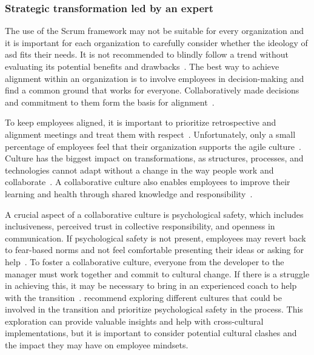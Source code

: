 
\subsubsection*{Strategic transformation led by an expert}\label{subsubsec:StrategicTransformation}
The use of the Scrum \gls{framework} may not be suitable for every organization and it is important for each organization to carefully consider whether the \gls{ideology} of \ac{asd} fits their needs. It is not recommended to blindly follow a trend without evaluating its potential benefits and drawbacks~\cite[p.~152]{Meyer2014ABM}. The best way to achieve alignment within an organization is to involve employees in decision-making and find a common ground that works for everyone. Collaboratively made decisions and \gls{commitment} to them form the basis for alignment~\cite[p.~6997]{Moe2019Tai}.

To keep employees aligned, it is important to prioritize retrospective and alignment meetings and treat them with respect~\cite[p.~28]{Uludag2019Ita}. Unfortunately, only a small percentage of employees feel that their organization supports the \gls{agile} culture~\cite[p.~27]{Koning2019AT}. Culture has the biggest impact on \glspl{transformation}, as structures, processes, and technologies cannot adapt without a change in the way people work and collaborate~\cite[pp.~31--32]{Thorgren2019Tro}. A collaborative culture also enables employees to improve their learning and health through shared knowledge and responsibility~\cite[p.~32]{Thorgren2019Tro}.

A crucial aspect of a collaborative culture is psychological safety, which includes inclusiveness, perceived trust in collective responsibility, and openness in communication. If psychological safety is not present, employees may revert back to fear-based norms and not feel comfortable presenting their ideas or asking for help~\cite[p.~5]{Alami2022HSa}. To foster a collaborative culture, everyone from the \gls{developer} to the manager must work together and commit to cultural change. If there is a struggle in achieving this, it may be necessary to bring in an experienced coach to help with the \gls{transition}~\cite[p.~237]{Moreira2013AtA}.  recommend exploring different cultures that could be involved in the \gls{transition} and prioritize psychological safety in the process. This exploration can provide valuable insights and help with cross-cultural implementations, but it is important to consider potential cultural clashes and the impact they may have on employee \glspl{mindset}.

